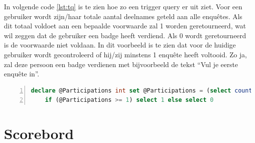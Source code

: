 In volgende code \ref{lst:tq} is te zien hoe zo een trigger query er uit ziet. Voor een gebruiker wordt zijn/haar totale aantal deelnames geteld aan alle enquêtes. Als dit totaal voldoet aan een bepaalde voorwaarde zal 1 worden geretourneerd, wat wil zeggen dat de gebruiker een badge heeft verdiend. Als 0 wordt geretourneerd is de voorwaarde niet voldaan. In dit voorbeeld is te zien dat voor de huidige gebruiker wordt gecontroleerd of hij/zij minstens 1 enquête heeft voltooid. Zo ja, zal deze persoon een badge verdienen met bijvoorbeeld de tekst ``Vul je eerste enquête in''.

\begin{lstlisting}[caption={De badge trigger query.},
    label={lst:tq},
    language=SQL,
    showspaces=false,
    basicstyle=\ttfamily,
    numbers=left,
    numberstyle=\tiny,
    numbersep=1pt,
    breaklines=true
    commentstyle=\color{gray}]
    declare @Participations int set @Participations = (select count(*) from QuestionBot_Participations where UserID = @UserID) 
    if (@Participations >= 1) select 1 else select 0
\end{lstlisting}

\section{Scorebord}

